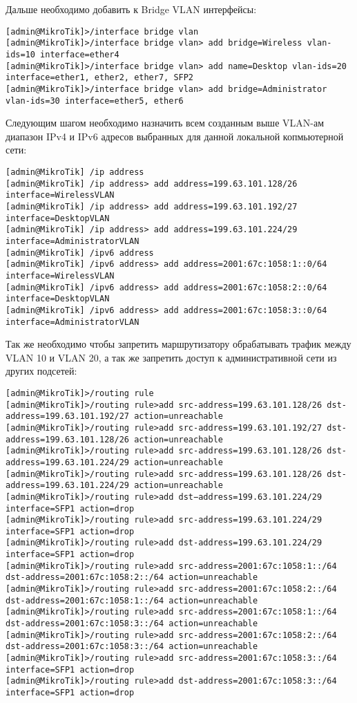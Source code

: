 Дальше необходимо добавить к Bridge VLAN интерфейсы:

\begin{lstlisting}
[admin@MikroTik]>/interface bridge vlan
[admin@MikroTik]>/interface bridge vlan> add bridge=Wireless vlan-ids=10 interface=ether4
[admin@MikroTik]>/interface bridge vlan> add name=Desktop vlan-ids=20 interface=ether1, ether2, ether7, SFP2 
[admin@MikroTik]>/interface bridge vlan> add bridge=Administrator vlan-ids=30 interface=ether5, ether6
\end{lstlisting}

Следующим шагом необходимо назначить всем созданным выше VLAN-ам диапазон IPv4 и IPv6 адресов выбранных для данной локальной копмьютерной сети:

\begin{lstlisting}
[admin@MikroTik] /ip address
[admin@MikroTik] /ip address> add address=199.63.101.128/26 interface=WirelessVLAN
[admin@MikroTik] /ip address> add address=199.63.101.192/27 interface=DesktopVLAN
[admin@MikroTik] /ip address> add address=199.63.101.224/29 interface=AdministratorVLAN
[admin@MikroTik] /ipv6 address
[admin@MikroTik] /ipv6 address> add address=2001:67c:1058:1::0/64 interface=WirelessVLAN
[admin@MikroTik] /ipv6 address> add address=2001:67c:1058:2::0/64 interface=DesktopVLAN
[admin@MikroTik] /ipv6 address> add address=2001:67c:1058:3::0/64 interface=AdministratorVLAN
\end{lstlisting}

Так же необходимо чтобы запретить маршрутизатору обрабатывать трафик между VLAN 10 и VLAN 20, а так же запретить доступ к административной сети из других подсетей:

\begin{lstlisting}
[admin@MikroTik]>/routing rule
[admin@MikroTik]>/routing rule>add src-address=199.63.101.128/26 dst-address=199.63.101.192/27 action=unreachable
[admin@MikroTik]>/routing rule>add src-address=199.63.101.192/27 dst-address=199.63.101.128/26 action=unreachable
[admin@MikroTik]>/routing rule>add src-address=199.63.101.128/26 dst-address=199.63.101.224/29 action=unreachable
[admin@MikroTik]>/routing rule>add src-address=199.63.101.128/26 dst-address=199.63.101.224/29 action=unreachable
[admin@MikroTik]>/routing rule>add dst−address=199.63.101.224/29 interface=SFP1 action=drop
[admin@MikroTik]>/routing rule>add src-address=199.63.101.224/29 interface=SFP1 action=drop
[admin@MikroTik]>/routing rule>add dst-address=199.63.101.224/29 interface=SFP1 action=drop
[admin@MikroTik]>/routing rule>add src-address=2001:67c:1058:1::/64 dst-address=2001:67c:1058:2::/64 action=unreachable
[admin@MikroTik]>/routing rule>add src-address=2001:67c:1058:2::/64 dst-address=2001:67c:1058:1::/64 action=unreachable
[admin@MikroTik]>/routing rule>add src-address=2001:67c:1058:1::/64 dst-address=2001:67c:1058:3::/64 action=unreachable
[admin@MikroTik]>/routing rule>add src-address=2001:67c:1058:2::/64 dst-address=2001:67c:1058:3::/64 action=unreachable
[admin@MikroTik]>/routing rule>add src-address=2001:67c:1058:3::/64 interface=SFP1 action=drop
[admin@MikroTik]>/routing rule>add dst-address=2001:67c:1058:3::/64 interface=SFP1 action=drop
\end{lstlisting}


